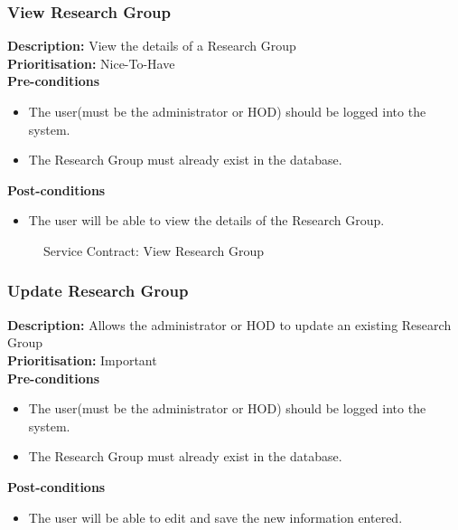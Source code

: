 \documentclass[a4paper]{article}
\begin{document}
    	\pagebreak
    \subsubsection{View Research Group}
    	\textbf{Description:} View the details of a Research Group \\
    	\textbf{Prioritisation:} Nice-To-Have\\
    	
    	\textbf{Pre-conditions}
    	 \begin{itemize}
    		\item The user(must be the administrator or HOD) should be logged into the system.
    		\item The Research Group must already exist in the database.
        \end{itemize}
    	
    	\textbf{Post-conditions}
    	 \begin{itemize}
    		\item The user will be able to view the details of the Research Group.
    	\end{itemize}
    	
    	    	\begin{figure}[H]
    	    		\centering
    	    		\caption{Service Contract: View Research Group}
    	    	\end{figure}
    	
    	\pagebreak
    \subsubsection{Update Research Group}
    	\textbf{Description:} Allows the administrator or HOD to update an existing Research Group\\
    	\textbf{Prioritisation:} Important\\
    	
    	\textbf{Pre-conditions}
    	 \begin{itemize}
    		\item The user(must be the administrator or HOD) should be logged into the system.
    		\item The Research Group must already exist in the database.
    	\end{itemize}
    	
    	\textbf{Post-conditions}
    	 \begin{itemize}
    		\item The user will be able to edit and save the new information entered.
    	\end{itemize}
    	
\end{document}
